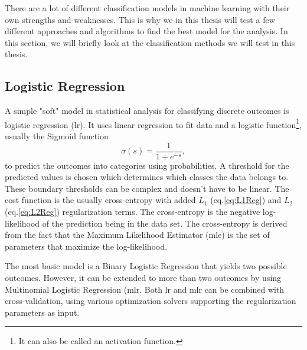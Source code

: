 \documentclass[a4paper, american, 12pt]{report}
\begin{document}
	 There are a lot of different classification models in machine learning with their own strengths and weaknesses. This is why we in this thesis will test a few different approaches and algorithms to find the best model for the analysis. In this section, we will briefly look at the classification methods we will test in this thesis.
	
	
	\subsection{Logistic Regression}
	\label{subsect:Theory-LogisticRegression}
	A simple "soft" model in statistical analysis for classifying discrete outcomes is logistic regression (\acrshort{lr})\cite{mehta2019high}. It uses linear regression to fit data and a logistic function\footnote{It can also be called an activation function.}, usually the Sigmoid function 
	\begin{equation}
	\label{eq:Sigmoid}
		\sigma(s) = \frac{1}{1+e^{-s}},
	\end{equation}
	to predict the outcomes into categories using probabilities. A threshold for the predicted values is chosen which determines which classes the data belongs to. These boundary thresholds can be complex and doesn't have to be linear. The cost function is the usually cross-entropy with added $L_1$ (eq.\ref{eq:L1Reg}) and $L_2$ (eq.\ref{eq:L2Reg}) regularization terms. The cross-entropy is the negative log-likelihood of the prediction being in the data set. The cross-entropy is derived from the fact that the Maximum Likelihood Estimator (\acrshort{mle}) is the set of parameters that maximize the log-likelihood.
	
	The most basic model is a Binary Logistic Regression that yields two possible outcomes. However, it can be extended to more than two outcomes by using Multinomial Logistic Regression (\acrshort{mlr}. Both \acrshort{lr} and \acrshort{mlr} can be combined with cross-validation, using various optimization solvers supporting the regularization parameters as input.
	
	
\end{document}
